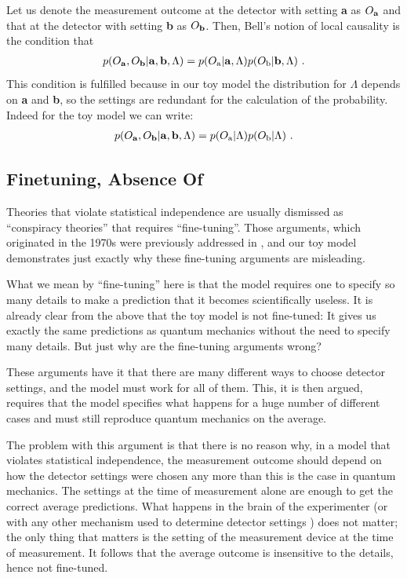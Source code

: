 \documentclass[12pt]{article}
\def\beqn{\begin{eqnarray}}
\def\eeqn{\end{eqnarray}}
\begin{document}
Let us denote the measurement outcome at the detector with setting {\bf a} as $O_{\rm \bf a}$ and that at the detector with setting {\bf b} as $O_{\rm \bf b}$. 
Then, Bell's notion of local causality is the condition that
\beqn
p(O_{\rm \bf a},O_{\rm \bf b}| {\mathrm {\bf a}}, {\mathrm {\bf b}}, \Lambda)  = p(O_{\bf \rm a}| {\mathrm {\bf a}}, \Lambda) p(O_{\bf \rm b}| {\mathrm {\bf b}}, \Lambda) ~.
\eeqn
This condition is fulfilled because in our toy model the distribution for $\Lambda$ depends on {\bf a} and {\bf b}, so the settings are redundant for the calculation of the probability. Indeed for the toy model we can write:
\beqn
p(O_{\rm \bf a},O_{\rm \bf b}| {\mathrm {\bf a}}, {\mathrm {\bf b}}, \Lambda)  = p(O_{\bf \rm a}| \Lambda) p(O_{\bf \rm b}| \Lambda) ~.
\eeqn

\subsection{Finetuning, Absence Of}
\label{less}



Theories that violate statistical independence are usually dismissed as ``conspiracy theories'' that requires ``fine-tuning''. Those arguments, which originated in the 1970s \cite{SC,Bell77} were previously addressed in \cite{Hossenfelder:2019shy,otherpaper}, and our toy model demonstrates just exactly why these fine-tuning arguments are misleading.

What we mean by ``fine-tuning'' here is that the model requires one to specify so many details to make a prediction that it becomes scientifically useless. It is already clear from the above that the toy model is not fine-tuned: It gives us exactly the same predictions as quantum mechanics without the need to specify many details. But just why are the fine-tuning arguments wrong?

These arguments have it that there are many different ways to choose detector settings, and the model must work for
all of them. This, it is then argued, requires that the model specifies what happens for a huge number of different cases and must still
reproduce quantum mechanics on the average. 

The problem with this argument is that there is no reason why, in a model that violates statistical independence, the measurement outcome should depend on
how the detector settings were chosen any more than this is the case in quantum mechanics. The settings at the time of measurement alone 
are enough to get the correct average predictions. What happens in the brain of the experimenter (or with any other mechanism used to determine detector settings \cite{Leung:2017ndn,bigbell,Friedman:2018byq}) does not matter; the only thing that matters is the setting of the measurement device at the time of measurement. It follows that the average outcome is insensitive to the details, hence not fine-tuned. 
\end{document}
